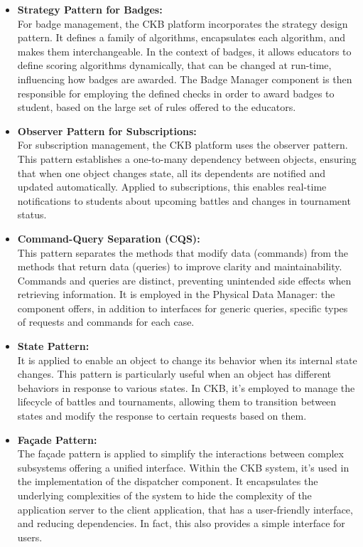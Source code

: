\begin{itemize}
    \item \textbf{Strategy Pattern for Badges:} \\
    For badge management, the CKB platform incorporates the strategy design pattern. It defines a family of algorithms, encapsulates each algorithm, and makes them interchangeable. In the context of badges, it allows educators to define scoring algorithms dynamically, that can be changed at run-time, influencing how badges are awarded. The Badge Manager component is then responsible for employing the defined checks in order to award badges to student, based on the large set of rules offered to the educators.

    \item \textbf{Observer Pattern for Subscriptions:} \\
    For subscription management, the CKB platform uses the observer pattern. This pattern establishes a one-to-many dependency between objects, ensuring that when one object changes state, all its dependents are notified and updated automatically. Applied to subscriptions, this enables real-time notifications to students about upcoming battles and changes in tournament status.

    \item \textbf{Command-Query Separation (CQS):} \\
    This pattern separates the methods that modify data (commands) from the methods that return data (queries) to improve clarity and maintainability. Commands and queries are distinct, preventing unintended side effects when retrieving information. It is employed in the Physical Data Manager: the component offers, in addition to interfaces for generic queries, specific types of requests and commands for each case. 
    
    \item \textbf{State Pattern:} \\
    It is applied to enable an object to change its behavior when its internal state changes. This pattern is particularly useful when an object has different behaviors in response to various states. In CKB, it’s employed to manage the lifecycle of battles and tournaments, allowing them to transition between states and modify the response to certain requests based on them. 

    \item \textbf{Façade Pattern:} \\
    The façade pattern is applied to simplify the interactions between complex subsystems offering a unified interface. Within the CKB system, it’s used in the implementation of the dispatcher component. It encapsulates the underlying complexities of the system to hide the complexity of the application server to the client application, that has a user-friendly interface, and reducing dependencies. In fact, this also provides a simple interface for users.


\end{itemize}
